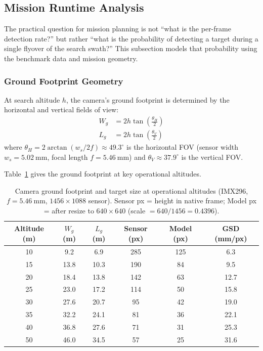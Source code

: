 \subsection{Mission Runtime Analysis}\label{app:cv:runtime}

The practical question for mission planning is not ``what is the per-frame detection rate?'' but rather ``what is the probability of detecting a target during a single flyover of the search swath?''  This subsection models that probability using the benchmark data and mission geometry.

\subsubsection{Ground Footprint Geometry}

At search altitude $h$, the camera's ground footprint is determined by the horizontal and vertical fields of view:
\begin{align}
    W_g &= 2h \tan\!\left(\frac{\theta_H}{2}\right) \label{eq:footprint_w} \\
    L_g &= 2h \tan\!\left(\frac{\theta_V}{2}\right) \label{eq:footprint_l}
\end{align}
where $\theta_H = 2\arctan(w_s / 2f) \approx 49.3^{\circ}$ is the horizontal FOV (sensor width $w_s = \SI{5.02}{\milli\metre}$, focal length $f = \SI{5.46}{\milli\metre}$) and $\theta_V \approx 37.9^{\circ}$ is the vertical FOV.

Table~\ref{tab:footprint} gives the ground footprint at key operational altitudes.

\begin{table}[ht]
  \centering
  \caption{Camera ground footprint and target size at operational altitudes (IMX296, $f = \SI{5.46}{\milli\metre}$, $1456\!\times\!1088$ sensor).  Sensor px = height in native frame; Model px = after resize to $640\!\times\!640$ (scale $= 640/1456 = 0.4396$).}\label{tab:footprint}
  \begin{tabular}{@{}c c c c c c@{}}
    \toprule
    \textbf{Altitude (m)} & $W_g$ \textbf{(m)} & $L_g$ \textbf{(m)} & \textbf{Sensor (px)} & \textbf{Model (px)} & \textbf{GSD (mm/px)} \\
    \midrule
    10  & 9.2  & 6.9  & 285 & 125 & 6.3 \\
    15  & 13.8 & 10.3 & 190 & 84  & 9.5 \\
    20  & 18.4 & 13.8 & 142 & 63  & 12.7 \\
    25  & 23.0 & 17.2 & 114 & 50  & 15.8 \\
    30  & 27.6 & 20.7 & 95  & 42  & 19.0 \\
    35  & 32.2 & 24.1 & 81  & 36  & 22.1 \\
    40  & 36.8 & 27.6 & 71  & 31  & 25.3 \\
    50  & 46.0 & 34.5 & 57  & 25  & 31.6 \\
    \bottomrule
  \end{tabular}
\end{table}

